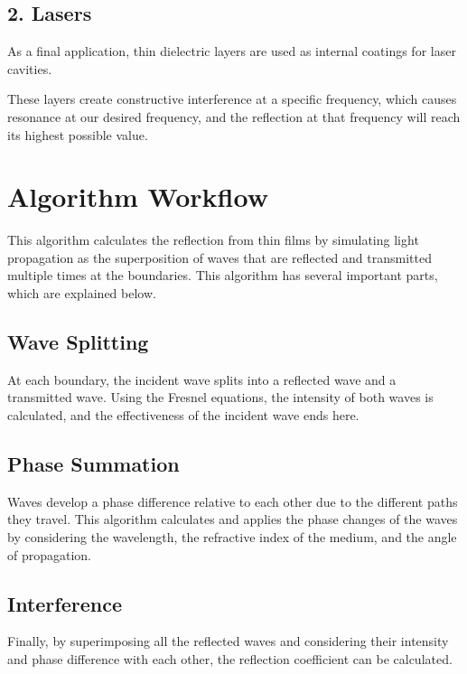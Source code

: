 \documentclass{article}
\begin{document}
	\subsection*{2. Lasers}
	
	
	As a final application, thin dielectric layers are used as internal coatings for laser cavities.
	
	These layers create constructive interference at a specific frequency, which causes resonance at our desired frequency, and the reflection at that frequency will reach its highest possible value.
	\newpage
	
	
	
	\section*{Algorithm Workflow}
		
		This algorithm calculates the reflection from thin films by simulating light propagation as the superposition of waves that are reflected and transmitted multiple times at the boundaries. This algorithm has several important parts, which are explained below.
		
	\subsection*{Wave Splitting}
		
		At each boundary, the incident wave splits into a reflected wave and a transmitted wave. Using the Fresnel equations, the intensity of both waves is calculated, and the effectiveness of the incident wave ends here.
		
	\subsection*{Phase Summation}
		
		Waves develop a phase difference relative to each other due to the different paths they travel. This algorithm calculates and applies the phase changes of the waves by considering the wavelength, the refractive index of the medium, and the angle of propagation.
		
	\subsection*{Interference}
		
		Finally, by superimposing all the reflected waves and considering their intensity and phase difference with each other, the reflection coefficient can be calculated.
		
\end{document}
